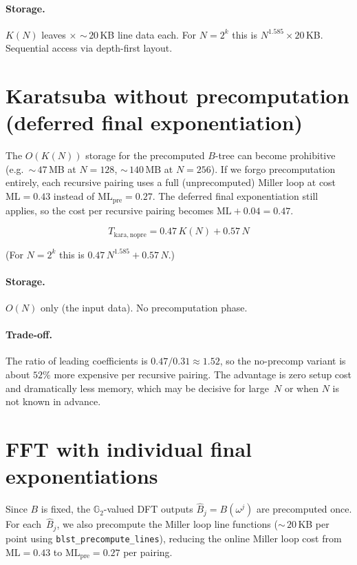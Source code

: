 \documentclass[11pt]{article}
\newcommand{\Gtwo}{\mathbb{G}_2}
\newcommand{\MLpre}{\mathrm{ML_{pre}}}
\theoremstyle{plain}
\theoremstyle{remark}
\begin{document}
\paragraph{Storage.}
$K(N)$ leaves $\times$ ${\sim}\,20$\,KB line data each.
For $N = 2^k$ this is $N^{1.585} \times 20$\,KB.
Sequential access via depth-first layout.

\section{Karatsuba without precomputation (deferred final exponentiation)}

The $O(K(N))$ storage for the precomputed $B$-tree
can become prohibitive
(e.g.\ ${\sim}\,47$\,MB at $N = 128$,
${\sim}\,140$\,MB at $N = 256$).
If we forgo precomputation entirely,
each recursive pairing uses a full (unprecomputed) Miller loop
at cost $\mathrm{ML} = 0.43$ instead of $\MLpre = 0.27$.
The deferred final exponentiation still applies,
so the cost per recursive pairing becomes
$\mathrm{ML} + 0.04 = 0.47$.

\[
\boxed{T_{\mathrm{kara,nopre}} = 0.47\,K(N) + 0.57\,N}
\]

\noindent
(For $N = 2^k$ this is $0.47\,N^{1.585} + 0.57\,N$.)

\paragraph{Storage.}
$O(N)$ only (the input data).
No precomputation phase.

\paragraph{Trade-off.}
The ratio of leading coefficients is $0.47/0.31 \approx 1.52$,
so the no-precomp variant is about $52\%$ more expensive
per recursive pairing.
The advantage is zero setup cost
and dramatically less memory,
which may be decisive for large~$N$
or when $N$ is not known in advance.

\section{FFT with individual final exponentiations}

Since $B$ is fixed,
the $\Gtwo$-valued DFT outputs
$\hat{B}_j = B(\omega^j)$ are precomputed once.
For each~$\hat{B}_j$,
we also precompute the Miller loop line functions
(${\sim}\,20$\,KB per point using \texttt{blst\_precompute\_lines}),
reducing the online Miller loop cost
from $\mathrm{ML} = 0.43$ to $\MLpre = 0.27$ per pairing.
\end{document}
